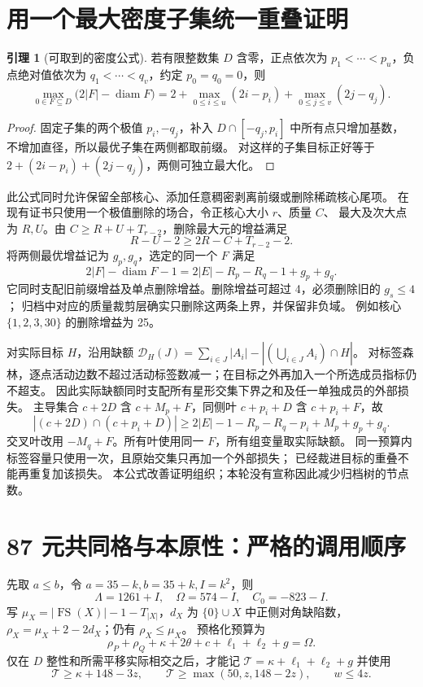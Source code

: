 \documentclass[11pt,a4paper]{article}
\newcommand{\FS}{\operatorname{FS}}
\newcommand{\T}{\mathcal T}
\newcommand{\Def}{\mathcal D}
\theoremstyle{definition}
\newtheorem{lemma}[theorem]{引理}
\begin{document}
\section{用一个最大密度子集统一重叠证明}\label{density}
\begin{lemma}[可取到的密度公式]\label{envelope}
若有限整数集 $D$ 含零，正点依次为 $p_1<\cdots<p_u$，负点绝对值依次为
$q_1<\cdots<q_v$，约定 $p_0=q_0=0$，则
\[
 \max_{0\in F\subseteq D}\bigl(2|F|-\operatorname{diam}F\bigr)
 =2+\max_{0\le i\le u}(2i-p_i)+\max_{0\le j\le v}(2j-q_j).
\]
\end{lemma}
\begin{proof}
固定子集的两个极值 $p_i,-q_j$，补入 $D\cap[-q_j,p_i]$ 中所有点只增加基数，
不增加直径，所以最优子集在两侧都取前缀。
对这样的子集目标正好等于 $2+(2i-p_i)+(2j-q_j)$，两侧可独立最大化。
\end{proof}
此公式同时允许保留全部核心、添加任意稠密剥离前缀或删除稀疏核心尾项。
在现有证书只使用一个极值删除的场合，令正核心大小 $r$、质量 $C$、
最大及次大点为 $R,U$。由 $C\ge R+U+T_{r-2}$，删除最大元的增益满足
\[
 R-U-2\ge2R-C+T_{r-2}-2.
\]
将两侧最优增益记为 $g_p,g_q$，选定的同一个 $F$ 满足
\[
 2|F|-\operatorname{diam}F-1=2|E|-R_p-R_q-1+g_p+g_q.
\]
它同时支配旧前缀增益及单点删除增益。删除增益可超过 4，必须删除旧的 $g_s\le4$；
归档中对应的质量裁剪层确实只删除这两条上界，并保留非负域。
例如核心 $\{1,2,3,30\}$ 的删除增益为 25。

对实际目标 $H$，沿用缺额 $\Def_H(J)=\sum_{i\in J}|A_i|-|(\bigcup_{i\in J}A_i)\cap H|$。
对标签森林，逐点活动边数不超过活动标签数减一；在目标之外再加入一个所选成员指标仍不超支。
因此实际缺额同时支配所有星形交集下界之和及任一单独成员的外部损失。
主导集合 $c+2D$ 含 $c+M_p+F$，同侧叶 $c+p_i+D$ 含 $c+p_i+F$，故
\[
 |(c+2D)\cap(c+p_i+D)|
 \ge2|E|-1-R_p-R_q-p_i+M_p+g_p+g_q.
\]
交叉叶改用 $-M_q+F$。所有叶使用同一 $F$，所有组变量取实际缺额。
同一预算内标签容量只使用一次，且原始交集只再加一个外部损失；
已经裁进目标的重叠不能再重复加该损失。
本公式改善证明组织；本轮没有宣称因此减少归档树的节点数。

\section{87 元共同格与本原性：严格的调用顺序}\label{lattice}
先取 $a\le b$，令 $a=35-k,b=35+k,I=k^2$，则
\[
 \Lambda=1261+I,\quad\Omega=574-I,\quad C_0=-823-I.
\]
写 $\mu_X=|\FS(X)|-1-T_{|X|}$，$d_X$ 为 $\{0\}\cup X$ 中正侧对角缺陷数，
$\rho_X=\mu_X+2-2d_X$；仍有 $\rho_X\le\mu_X$。
预格化预算为
\[
 \rho_P+\rho_Q+\kappa+2\theta+c+\ell_1+\ell_2+g=\Omega.
\]
仅在 $D$ 整性和所需平移实际相交之后，才能记
$\T=\kappa+\ell_1+\ell_2+g$ 并使用
\begin{equation}\label{post}
 \T\ge\kappa+148-3z,\qquad \T\ge\max(50,z,148-2z),\qquad w\le4z.
\end{equation}
\end{document}
